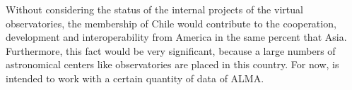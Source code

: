 Without considering the status of the internal projects of the virtual
observatories, the membership of Chile would contribute to the cooperation,
development and interoperability from America in the same percent that Asia.
Furthermore, this fact would be very significant, because a large numbers of
astronomical centers like observatories are placed in this country.  For now, is
intended to work with a certain quantity of data of ALMA.\\
